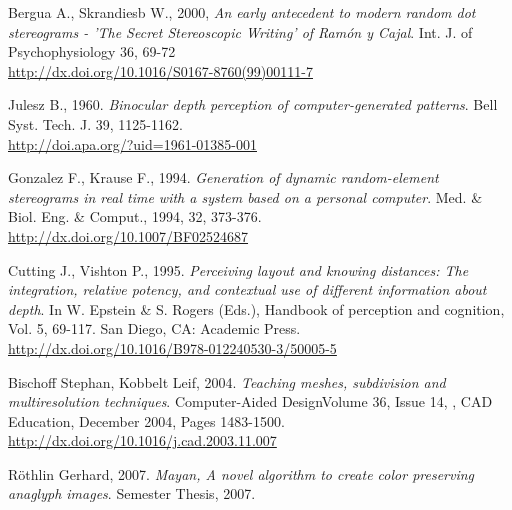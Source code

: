 \begin{thebibliography}{12}
Bergua A., Skrandiesb W., 2000,
\textit{An early antecedent to modern random dot stereograms - 'The Secret Stereoscopic Writing' of Ram\'on y Cajal}.
Int. J. of Psychophysiology 36, 69-72\\
\url{http://dx.doi.org/10.1016/S0167-8760(99)00111-7}

Julesz B., 1960.
\textit{Binocular depth perception of computer-generated patterns}.
Bell Syst. Tech. J. 39, 1125-1162.\\
\url{http://doi.apa.org/?uid=1961-01385-001}

Gonzalez F., Krause F., 1994.
\textit{Generation of dynamic random-element stereograms in real time with a system based on a personal computer}.
Med. \& Biol. Eng. \& Comput., 1994, 32, 373-376.\\
\url{http://dx.doi.org/10.1007/BF02524687}

Cutting J., Vishton P., 1995.
\textit{Perceiving layout and knowing distances: The integration, relative potency, and contextual use of different information about depth}.
In W. Epstein \& S. Rogers (Eds.), Handbook of perception and cognition, Vol. 5, 69-117. San Diego, CA: Academic Press.\\
\url{http://dx.doi.org/10.1016/B978-012240530-3/50005-5}

Bischoff Stephan, Kobbelt Leif, 2004.
\textit{Teaching meshes, subdivision and multiresolution techniques}.
Computer-Aided DesignVolume 36, Issue 14, , CAD Education, December 2004, Pages 1483-1500.\\
\url{http://dx.doi.org/10.1016/j.cad.2003.11.007}

R\"othlin Gerhard, 2007.
\textit{Mayan, A novel algorithm to create color preserving anaglyph images}.
Semester Thesis, 2007.

\end{thebibliography}

\renewcommand*\refname{Links}

